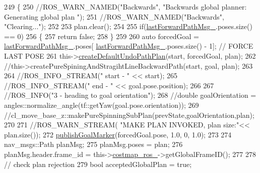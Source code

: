 \begin{DoxyCode}
249         \{
250             \textcolor{comment}{//ROS\_WARN\_NAMED("Backwards", "Backwards global planner: Generating global plan ");}
251             \textcolor{comment}{//ROS\_WARN\_NAMED("Backwards", "Clearing...");}
252 
253             plan.clear();
254 
255             \textcolor{keywordflow}{if}(\hyperlink{classcl__move__base__z_1_1undo__path__global__planner_1_1UndoPathGlobalPlanner_a9a4a6e40f5b6cb5f77dedbc5b6170871}{lastForwardPathMsg\_}.poses.size() == 0)
256             \{
257                 \textcolor{keywordflow}{return} \textcolor{keyword}{false};
258             \}
259 
260             \textcolor{keyword}{auto} forcedGoal = \hyperlink{classcl__move__base__z_1_1undo__path__global__planner_1_1UndoPathGlobalPlanner_a9a4a6e40f5b6cb5f77dedbc5b6170871}{lastForwardPathMsg\_}.poses[
      \hyperlink{classcl__move__base__z_1_1undo__path__global__planner_1_1UndoPathGlobalPlanner_a9a4a6e40f5b6cb5f77dedbc5b6170871}{lastForwardPathMsg\_}.poses.size() - 1]; \textcolor{comment}{// FORCE LAST POSE}
261             this->\hyperlink{classcl__move__base__z_1_1undo__path__global__planner_1_1UndoPathGlobalPlanner_a659c16f439d33ac7026a54bb65c26ca8}{createDefaultUndoPathPlan}(start, forcedGoal, plan);
262             \textcolor{comment}{//this->createPureSpiningAndStragihtLineBackwardPath(start, goal, plan);}
263 
264             \textcolor{comment}{//ROS\_INFO\_STREAM(" start - " << start);}
265             \textcolor{comment}{//ROS\_INFO\_STREAM(" end - " << goal.pose.position);}
266 
267             \textcolor{comment}{//ROS\_INFO("3 - heading to goal orientation");}
268             \textcolor{comment}{//double goalOrientation = angles::normalize\_angle(tf::getYaw(goal.pose.orientation));}
269             \textcolor{comment}{//cl\_move\_base\_z::makePureSpinningSubPlan(prevState,goalOrientation,plan);}
270 
271             \textcolor{comment}{//ROS\_WARN\_STREAM( "MAKE PLAN INVOKED, plan size:"<< plan.size());}
272             \hyperlink{classcl__move__base__z_1_1undo__path__global__planner_1_1UndoPathGlobalPlanner_a37a85e1cd57173902d8302cb8cb9b933}{publishGoalMarker}(forcedGoal.pose, 1.0, 0, 1.0);
273 
274             nav\_msgs::Path planMsg;
275             planMsg.poses = plan;
276             planMsg.header.frame\_id = this->\hyperlink{classcl__move__base__z_1_1undo__path__global__planner_1_1UndoPathGlobalPlanner_ab63eeb465e3ae989a6edcc4d059cf8f0}{costmap\_ros\_}->getGlobalFrameID();
277 
278             \textcolor{comment}{// check plan rejection}
279             \textcolor{keywordtype}{bool} acceptedGlobalPlan = \textcolor{keyword}{true};

\end{DoxyCode}
